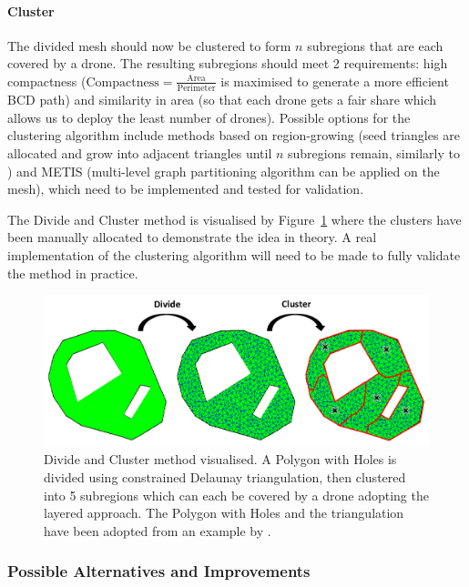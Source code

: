 \paragraph{Cluster} The divided mesh should now be clustered to form $n$ subregions that are each covered by a drone. The resulting subregions should meet 2 requirements: high compactness ($\mathrm{Compactness} = \frac{\mathrm{Area}}{\mathrm{Perimeter}}$ is maximised to generate a more efficient \gls{BCD} path) and similarity in area (so that each drone gets a fair share which allows us to deploy the least number of drones). Possible options for the clustering algorithm include methods based on region-growing (seed triangles are allocated and grow into adjacent triangles until $n$ subregions remain, similarly to \cite{skorobogatov2021multi}) and METIS \cite{karypis1997metis} (multi-level graph partitioning algorithm can be applied on the mesh), which need to be implemented and tested for validation. 

The Divide and Cluster method is visualised by Figure~\ref{fig:msp_divide_cluster} where the clusters have been manually allocated to demonstrate the idea in theory. A real implementation of the clustering algorithm will need to be made to fully validate the method in practice. 

\begin{figure}[h]
    \centering
    \includegraphics[width=\linewidth]{figs/Jihwan/Divide and Cluster.png}
    \caption[Divide and Cluster Method]
    {Divide and Cluster method visualised. A Polygon with Holes is divided using constrained Delaunay triangulation, then clustered into 5 subregions which can each be covered by a drone adopting the layered approach. The Polygon with Holes and the triangulation have been adopted from an example by \cite{cgal2024triangulation}.}
    \label{fig:msp_divide_cluster}
\end{figure}

\subsubsection{Possible Alternatives and Improvements}

